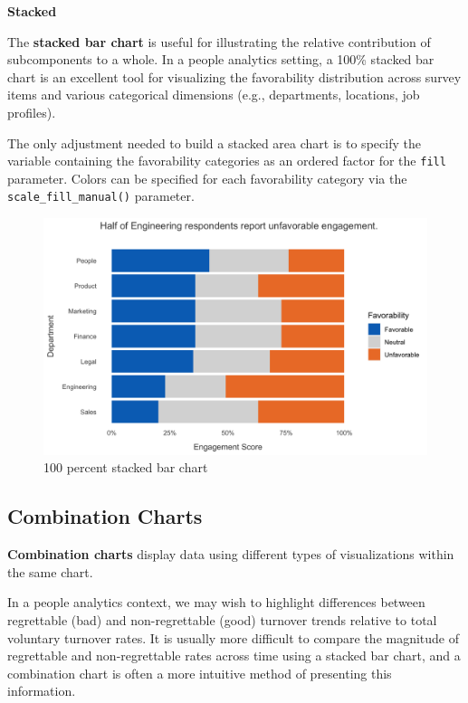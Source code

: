 \documentclass[
]{book}
\begin{document}
\textbf{Stacked}

The \textbf{stacked bar chart} is useful for illustrating the relative contribution of subcomponents to a whole. In a people analytics setting, a 100\% stacked bar chart is an excellent tool for visualizing the favorability distribution across survey items and various categorical dimensions (e.g., departments, locations, job profiles).

The only adjustment needed to build a stacked area chart is to specify the variable containing the favorability categories as an ordered factor for the \texttt{fill} parameter. Colors can be specified for each favorability category via the \texttt{scale\_fill\_manual()} parameter.

\begin{figure}

{\centering \includegraphics[width=1\linewidth]{graphics/stacked_bar_chart} 

}

\caption{100 percent stacked bar chart}\label{fig:sbar-chart}
\end{figure}

\hypertarget{combination-charts}{%
\subsection{Combination Charts}\label{combination-charts}}

\textbf{Combination charts} display data using different types of visualizations within the same chart.

In a people analytics context, we may wish to highlight differences between regrettable (bad) and non-regrettable (good) turnover trends relative to total voluntary turnover rates. It is usually more difficult to compare the magnitude of regrettable and non-regrettable rates across time using a stacked bar chart, and a combination chart is often a more intuitive method of presenting this information.
\end{document}
